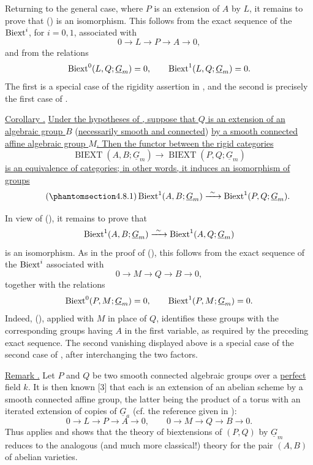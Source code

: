 Returning to the general case, where $P$ is an extension of $A$ by
$L$, it remains to prove that () is an isomorphism.  This follows
from the exact sequence of the $\operatorname{Biext}^i$, for $i=0,1$, associated
with
\[
 0\longrightarrow L\longrightarrow P\longrightarrow A
 \longrightarrow0,
\]
and from the relations
\[
 \Biext^0(L,Q;\underline G_m)=0,
 \qquad
 \Biext^1(L,Q;\underline G_m)=0.
\]
The first is a special case of the rigidity assertion in , and
the second is precisely the first case of .

\medskip
\noindent\underline{Corollary .}  \underline{Under the hypotheses
of , suppose that $Q$ is an extension of an algebraic group $B$}
(\underline{necessarily smooth and connected}) \underline{by a smooth connected affine
algebraic group $M$.  Then the functor between the rigid categories}
\[
 \operatorname{BIEXT}(A,B;\underline G_m)
 \longrightarrow
 \operatorname{BIEXT}(P,Q;\underline G_m)
\]
\underline{is an equivalence of categories; in other words, it
induces an isomorphism of groups}
\begin{equation}\tag{\SGARefTarget{sga7.sga7i.eviii.n4-8-1}{4.8.1}}
 \Biext^1(A,B;\underline G_m)
 \xrightarrow{\ \sim\ }
 \Biext^1(P,Q;\underline G_m).
\end{equation}

In view of (), it remains to prove that
\[
 \Biext^1(A,B;\underline G_m)
 \xrightarrow{\ \sim\ }
 \Biext^1(A,Q;\underline G_m)
\]
is an isomorphism.  As in the proof of (), this follows from the
exact sequence of the $\operatorname{Biext}^i$ associated with
\[
 0\longrightarrow M\longrightarrow Q\longrightarrow B
 \longrightarrow0,
\]
together with the relations
\[
 \Biext^0(P,M;\underline G_m)=0,
 \qquad
 \Biext^1(P,M;\underline G_m)=0.
\]
Indeed, (), applied with $M$ in place of $Q$, identifies these
groups with the corresponding groups having $A$ in the first
variable, as required by the preceding exact sequence.  The second
vanishing displayed above is a special case of the second case of
, after interchanging the two factors.

\medskip
\noindent\underline{Remark .}  Let $P$ and $Q$ be two smooth
connected algebraic groups over a \underline{perfect} field $k$.
It is then known [3] that each is an extension of an abelian scheme
by a smooth connected affine group, the latter being the product of
a torus with an iterated extension of copies of $\underline G_a$
(cf. the reference given in ):
\[
 0\longrightarrow L\longrightarrow P\longrightarrow A
 \longrightarrow0,
 \qquad
 0\longrightarrow M\longrightarrow Q\longrightarrow B
 \longrightarrow0.
\]
Thus  applies and shows that the theory of biextensions of $(P,Q)$
by $\underline G_m$ reduces to the analogous (and much more
classical!) theory for the pair $(A,B)$ of abelian varieties.

